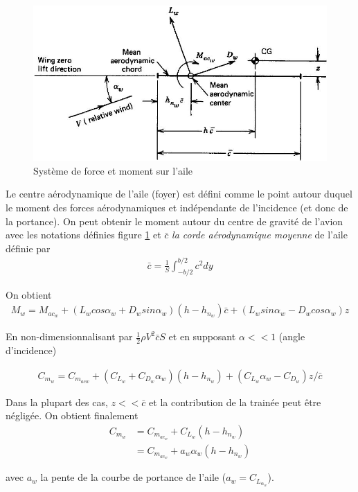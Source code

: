 \documentclass{report}
\begin{document}
\begin{figure}[h!]
    \centering
    \includegraphics[scale=0.7]{22.JPG}
    \caption{Système de force et moment sur l'aile}
    \label{22}
\end{figure}

Le centre aérodynamique de l'aile (foyer) est défini comme le point autour duquel le moment des forces aérodynamiques et indépendante de l'incidence (et donc de la portance). On peut obtenir le moment autour du centre de gravité de l'avion avec les notations définies figure \ref{22} et $\bar{c}$ \textit{la corde aérodynamique moyenne} de l'aile définie par 
\begin{eqnarray}
\bar{c}=\frac{1}{S}\int_{-b/2}^{b/2}c^2dy
\end{eqnarray}

On obtient
\begin{eqnarray}
M_w = M_{ac_w}+(L_w cos\alpha_w + D_w sin \alpha_w)(h-h_{n_w})\bar{c}+(L_wsin\alpha_w-D_wcos\alpha_w)z
\end{eqnarray}

En non-dimensionnalisant par $\frac{1}{2}\rho V^2\bar{c} S$ et en supposant $\alpha <<1$ (angle d'incidence)

\begin{eqnarray}
C_{m_w}=C_{m_{acw}}+(C_{L_w}+C_{D_w}\alpha_w)(h-h_{n_w})+(C_{L_w}\alpha_w-C_{D_w})z/\bar{c}
\end{eqnarray}

Dans la plupart des cas, $z<<\bar{c}$ et la contribution de la trainée peut être négligée. On obtient finalement
\begin{eqnarray}
C_{m_w}&=C_{m_{ac_w}}+C_{L_w}(h-h_{n_w})\\
 &=C_{m_{ac_w}}+a_w\alpha_w(h-h_{n_w})
\end{eqnarray}

avec $a_w$ la pente de la courbe de portance de l'aile ($a_w=C_{L_{\alpha_w}}$).
\end{document}
